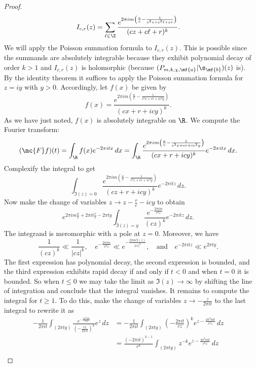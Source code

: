 \begin{proof}
      \[
        I_{c,r}(z) = \sum_{\ell \in \Z}\frac{e^{2\pi im\left(\frac{a}{c}-\frac{1}{c^{2}z+c^{2}\ell+cr}\right)}}{(cz+c\ell+r)^{k}}.
      \]
      We will apply the Poisson summation formula to $I_{c,r}(z)$. This is possible since the summands are absolutely integrable because they exhibit polynomial decay of order $k > 1$ and $I_{c,r}(z)$ is holomorphic (because $(P_{m,k,\chi,\mf{a}}|\s_{\mf{b}})(z)$ is). By the identity theorem it suffices to apply the Poisson summation formula for $z = iy$ with $y > 0$. Accordingly, let $f(x)$ be given by
      \[
        f(x) = \frac{e^{2\pi im\left(\frac{a}{c}-\frac{1}{c^{2}x+cr+ic^{2}y}\right)}}{(cx+r+icy)^{k}}.
      \]
      As we have just noted, $f(x)$ is absolutely integrable on $\R$. We compute the Fourier transform:
      \[
        (\mc{F}f)(t) = \int_{\R}f(x)e^{-2\pi itx}\,dx = \int_{\R}\frac{e^{2\pi im\left(\frac{a}{c}-\frac{1}{c^{2}x+cr+ic^{2}y}\right)}}{(cx+r+icy)^{k}}e^{-2\pi itx}\,dx.
      \]
      Complexify the integral to get
      \[
        \int_{\Im(z) = 0}\frac{e^{2\pi im\left(\frac{a}{c}-\frac{1}{c^{2}z+cr+ic^{2}y}\right)}}{(cz+r+icy)^{k}}e^{-2\pi itz}\,dz.
      \]
      Now make the change of variables $z \to z-\frac{r}{c}-icy$ to obtain
      \[
        e^{2\pi im\frac{a}{c}+2\pi it\frac{r}{c}-2\pi ty}\int_{\Im(z) = y}\frac{e^{-\frac{2\pi im}{c^{2}z}}}{(cz)^{k}}e^{-2\pi itz}\,dz.
      \]
      The integrand is meromorphic with a pole at $z = 0$. Moreover, we have
      \[
        \frac{1}{(cz)^{k}} \ll \frac{1}{|cz|^{k}}, \quad e^{-\frac{2\pi im}{c^{2}z}} \ll e^{-\frac{2\pi m\Im(z)}{|cz|^{2}}}, \quad \text{and} \quad e^{-2\pi itz} \ll e^{2\pi ty}.
      \]
      The first expression has polynomial decay, the second expression is bounded, and the third expression exhibits rapid decay if and only if $t < 0$ and when $t = 0$ it is bounded. So when $t \le 0$ we may take the limit as $\Im(z) \to \infty$ by shifting the line of integration and conclude that the integral vanishes. It remains to compute the integral for $t \ge 1$. To do this, make the change of variables $z \to -\frac{z}{2\pi it}$ to the last integral to rewrite it as
      \begin{align*}
        -\frac{1}{2\pi it}\int_{(2\pi ty)}\frac{e^{-\frac{4\pi^{2}mt}{c^{2}z}}}{\left(-\frac{cz}{2\pi it}\right)^{k}}e^{z}\,dz &= -\frac{1}{2\pi it}\int_{(2\pi ty)}\left(-\frac{2\pi it}{cz}\right)^{k}e^{z-\frac{4\pi^{2}mt}{c^{2}z}}\,dz \\
        &= \frac{(-2\pi it)^{k-1}}{c^{k}}\int_{(2\pi ty)}z^{-k}e^{z-\frac{4\pi^{2}mt}{c^{2}z}}\,dz \\

\end{align*}
\end{proof}
